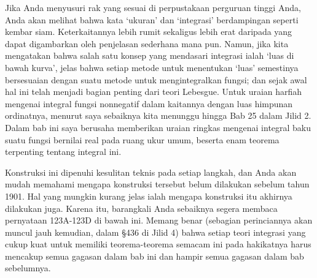 
\def\chaptername{Integrasi}


Jika Anda menyusuri rak yang sesuai di perpustakaan perguruan tinggi Anda,
Anda akan melihat bahwa kata `ukuran' dan `integrasi' berdampingan seperti
kembar siam. Keterkaitannya lebih rumit sekaligus lebih erat daripada yang
dapat digambarkan oleh penjelasan sederhana mana pun. Namun, jika kita
mengatakan bahwa salah satu konsep yang mendasari integrasi ialah `luas di
bawah kurva', jelas bahwa setiap metode untuk menentukan `luas' semestinya
bersesuaian dengan suatu metode untuk mengintegralkan fungsi; dan sejak
awal hal ini telah menjadi bagian penting dari teori Lebesgue. Untuk uraian
harfiah mengenai integral fungsi nonnegatif dalam kaitannya dengan luas
himpunan ordinatnya, menurut saya sebaiknya kita menunggu hingga Bab 25
dalam Jilid 2. Dalam bab ini saya berusaha memberikan uraian ringkas
mengenai integral baku suatu fungsi bernilai real pada ruang ukur umum,
beserta enam teorema terpenting tentang integral ini.

Konstruksi ini dipenuhi kesulitan teknis pada setiap langkah, dan Anda akan
mudah memahami mengapa konstruksi tersebut belum dilakukan sebelum tahun
1901. Hal yang mungkin kurang jelas ialah mengapa konstruksi itu akhirnya
dilakukan juga. Karena itu, barangkali Anda sebaiknya segera membaca
pernyataan 123A-123D %
di bawah ini. Memang benar (sebagian perinciannya akan muncul jauh kemudian,
dalam \S436 di Jilid 4) bahwa setiap teori integrasi yang cukup kuat untuk
memiliki teorema-teorema semacam ini pada hakikatnya harus mencakup semua
gagasan dalam bab ini dan hampir semua gagasan dalam bab sebelumnya.

\discrpage
